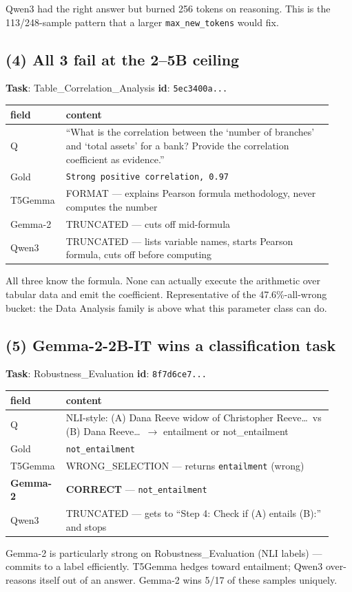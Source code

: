 \documentclass[11pt]{article}
\begin{document}
Qwen3 had the right answer but burned 256 tokens on reasoning. This is
the 113/248-sample pattern that a larger \verb|max_new_tokens| would fix.

\subsection*{(4) All 3 fail at the 2--5B ceiling}

\textbf{Task}: Table\_Correlation\_Analysis \quad \textbf{id}: \texttt{5ec3400a...}

\begin{center}\small
\begin{tabular}{p{0.13\linewidth}p{0.80\linewidth}}
\toprule
\textbf{field} & \textbf{content} \\
\midrule
Q    & ``What is the correlation between the `number of branches' and `total assets' for a bank? Provide the correlation coefficient as evidence.'' \\
Gold & \texttt{Strong positive correlation, 0.97} \\
T5Gemma & FORMAT --- explains Pearson formula methodology, never computes the number \\
Gemma-2 & TRUNCATED --- cuts off mid-formula \\
Qwen3 & TRUNCATED --- lists variable names, starts Pearson formula, cuts off before computing \\
\bottomrule
\end{tabular}
\end{center}

All three know the formula. None can actually execute the arithmetic
over tabular data and emit the coefficient. Representative of the
47.6\%-all-wrong bucket: the Data Analysis family is above what this
parameter class can do.

\subsection*{(5) Gemma-2-2B-IT wins a classification task}

\textbf{Task}: Robustness\_Evaluation \quad \textbf{id}: \texttt{8f7d6ce7...}

\begin{center}\small
\begin{tabular}{p{0.13\linewidth}p{0.80\linewidth}}
\toprule
\textbf{field} & \textbf{content} \\
\midrule
Q    & NLI-style: (A) Dana Reeve widow of Christopher Reeve\ldots~vs (B) Dana Reeve\ldots~$\to$ entailment or not\_entailment \\
Gold & \texttt{not\_entailment} \\
T5Gemma & WRONG\_SELECTION --- returns \texttt{entailment} (wrong) \\
\rowcolor{hilite}
\textbf{Gemma-2} & \textbf{CORRECT} --- \texttt{not\_entailment} \\
Qwen3 & TRUNCATED --- gets to ``Step 4: Check if (A) entails (B):'' and stops \\
\bottomrule
\end{tabular}
\end{center}

Gemma-2 is particularly strong on Robustness\_Evaluation (NLI labels)
--- commits to a label efficiently. T5Gemma hedges toward entailment;
Qwen3 over-reasons itself out of an answer. Gemma-2 wins 5/17 of these
samples uniquely.
\end{document}
